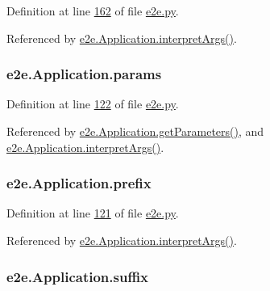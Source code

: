 Definition at line \hyperlink{e2e_8py_source_l00162}{162} of file \hyperlink{e2e_8py_source}{e2e.\+py}.



Referenced by \hyperlink{e2e_8py_source_l00167}{e2e.\+Application.\+interpret\+Args()}.

\subsubsection[{\texorpdfstring{params}{params}}]{\setlength{\rightskip}{0pt plus 5cm}e2e.\+Application.\+params}\hypertarget{classe2e_1_1_application_a57206c6ccc86c2659edfd8d73d2029f3}{}\label{classe2e_1_1_application_a57206c6ccc86c2659edfd8d73d2029f3}


Definition at line \hyperlink{e2e_8py_source_l00122}{122} of file \hyperlink{e2e_8py_source}{e2e.\+py}.



Referenced by \hyperlink{e2e_8py_source_l00340}{e2e.\+Application.\+get\+Parameters()}, and \hyperlink{e2e_8py_source_l00167}{e2e.\+Application.\+interpret\+Args()}.

\subsubsection[{\texorpdfstring{prefix}{prefix}}]{\setlength{\rightskip}{0pt plus 5cm}e2e.\+Application.\+prefix}\hypertarget{classe2e_1_1_application_a027ff25e5409ae17584978a09fc2611a}{}\label{classe2e_1_1_application_a027ff25e5409ae17584978a09fc2611a}


Definition at line \hyperlink{e2e_8py_source_l00121}{121} of file \hyperlink{e2e_8py_source}{e2e.\+py}.



Referenced by \hyperlink{e2e_8py_source_l00167}{e2e.\+Application.\+interpret\+Args()}.

\subsubsection[{\texorpdfstring{suffix}{suffix}}]{\setlength{\rightskip}{0pt plus 5cm}e2e.\+Application.\+suffix}\hypertarget{classe2e_1_1_application_a4d824ad36b051d2d629edb314385df0d}{}\label{classe2e_1_1_application_a4d824ad36b051d2d629edb314385df0d}


